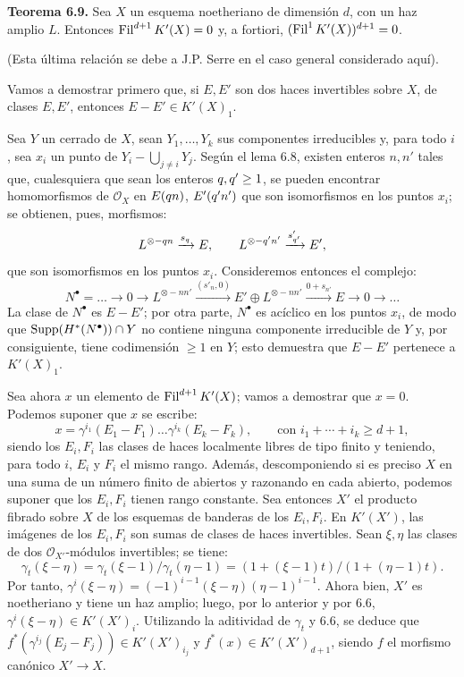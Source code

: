 \textbf{Teorema 6.9.} Sea $X$ un esquema noetheriano de dimensión $d$, con un haz amplio $L$. Entonces $\Fil^{d+1}K'(X)=0$ y, a fortiori, $(\Fil^1K'(X))^{d+1}=0$.

(Esta última relación se debe a J.P. Serre en el caso general considerado aquí).

Vamos a demostrar primero que, si $E,E'$ son dos haces invertibles sobre $X$, de clases $E,E'$, entonces $E-E'\in K'(X)_1$.

Sea $Y$ un cerrado de $X$, sean $Y_1,\ldots,Y_k$ sus componentes irreducibles y, para todo $i$, sea $x_i$ un punto de $Y_i-\bigcup_{j\ne i}Y_j$. Según el lema 6.8, existen enteros $n,n'$ tales que, cualesquiera que sean los enteros $\sisi{k}{q},\sisi{k'}{q'}\ge1$, se pueden encontrar homomorfismos de $\mathcal O_X$ en $E(\sisi{k}{q}n)$, $E'(\sisi{k'}{q'}n')$ que son isomorfismos en los puntos $x_i$; se obtienen, pues, morfismos:
\[
  L^{\otimes -\sisi{k}{q}n}\xrightarrow{\sisi{s_k}{s_q}} E,
  \qquad
  L^{\otimes -\sisi{k'}{q'}n'}\xrightarrow{s'_{\sisi{k'}{q'}}} E',
\]
que son isomorfismos en los puntos $x_i$. Consideremos entonces el complejo:
\[
  N^\bullet=\ldots\to0\to L^{\otimes -nn'}
    \xrightarrow{(s'_n,0)} E'\oplus L^{\otimes -nn'}
    \xrightarrow{0+s_{n'}} E\to0\to\ldots
\]
La clase de $N^\bullet$ es $E-E'$; por otra parte, $N^\bullet$ es acíclico en los puntos $x_i$, de modo que $\Supp(H^*(N^\bullet))\cap Y$ no contiene ninguna componente irreducible de $Y$ y, por consiguiente, tiene codimensión $\ge1$ en $Y$; esto demuestra que $E-E'$ pertenece a $K'(X)_1$.

Sea ahora $x$ un elemento de $\Fil^{d+1}K'(X)$; vamos a demostrar que $x=0$. Podemos suponer que $x$ se escribe:
\[
  x=\gamma^{i_1}(E_1-F_1)\ldots\gamma^{i_k}(E_k-F_k),
  \qquad\text{con } i_1+\cdots+i_k\ge d+1,
\]
siendo los $E_i,F_i$ las clases de haces localmente libres de tipo finito y teniendo, para todo $i$, $E_i$ y $F_i$ el mismo rango. Además, descomponiendo si es preciso $X$ en una suma de un número finito de abiertos y razonando en cada abierto, podemos suponer que los $E_i,F_i$ tienen rango constante. Sea entonces $X'$ el producto fibrado sobre $X$ de los esquemas de banderas de los $E_i,F_i$. En $K'(X')$, las imágenes de los $E_i,F_i$ son sumas de clases de haces invertibles. Sean $\xi,\eta$ las clases de dos $\mathcal O_{X'}$-módulos invertibles; se tiene:
\[
  \gamma_t(\xi-\eta)=\gamma_t(\xi-1)/\gamma_t(\eta-1)
  =(1+(\xi-1)t)/(1+(\eta-1)t).
\]
Por tanto, $\gamma^i(\xi-\eta)=(-1)^{i-1}(\xi-\eta)(\eta-1)^{i-1}$. Ahora bien, $X'$ es noetheriano y tiene un haz amplio; luego, por lo anterior y por 6.6, $\gamma^i(\xi-\eta)\in K'(X')_i$. Utilizando la aditividad de $\gamma_t$ y 6.6, se deduce que $f^*(\gamma^{i_j}(E_j-F_j))\in K'(X')_{i_j}$ y $f^*(x)\in K'(X')_{d+1}$, siendo $f$ el morfismo canónico $X'\to X$.

